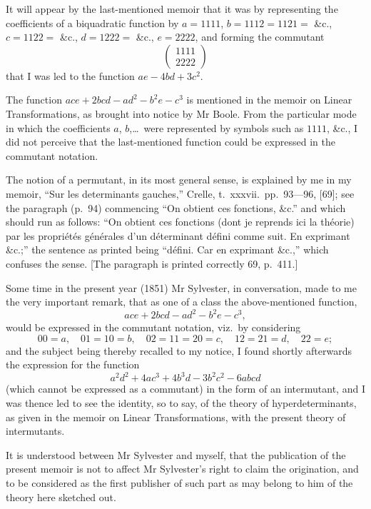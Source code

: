 \documentclass[11pt,a4paper]{article}
\theoremstyle{plain}
\begin{document}
It will appear by the last-mentioned memoir that it was by representing the coefficients of a biquadratic function by $a = 1111$, $b = 1112 = 1121 =$ \&c., $c = 1122 =$ \&c., $d = 1222 =$ \&c., $e = 2222$, and forming the commutant
\[\begin{pmatrix} 1111 \\ 2222 \end{pmatrix}\]
that I was led to the function $ae - 4bd + 3c^2$.

The function $ace + 2bcd - ad^2 - b^2e - c^3$ is mentioned in the memoir on Linear Transformations, as brought into notice by Mr Boole. From the particular mode in which the coefficients $a$, $b$,\ldots\ were represented by symbols such as $1111$, \&c., I did not perceive that the last-mentioned function could be expressed in the commutant notation.

The notion of a permutant, in its most general sense, is explained by me in my memoir, ``Sur les determinants gauches,'' Crelle, t.\ xxxvii.\ pp.\ 93---96, [69]; see the paragraph (p.\ 94) commencing ``On obtient ces fonctions, \&c.'' and which should run as follows: ``On obtient ces fonctions (dont je reprends ici la th\'{e}orie) par les propri\'{e}t\'{e}s g\'{e}n\'{e}rales d'un d\'{e}terminant d\'{e}fini comme suit. En exprimant \&c.;'' the sentence as printed being ``d\'{e}fini. Car en exprimant \&c.,'' which confuses the sense. [The paragraph is printed correctly 69, p.\ 411.]

Some time in the present year (1851) Mr Sylvester, in conversation, made to me the very important remark, that as one of a class the above-mentioned function,
\[ace + 2bcd - ad^2 - b^2e - c^3,\]
would be expressed in the commutant notation, viz.\ by considering
\[00 = a, \quad 01 = 10 = b, \quad 02 = 11 = 20 = c, \quad 12 = 21 = d, \quad 22 = e;\]
and the subject being thereby recalled to my notice, I found shortly afterwards the expression for the function
\[a^2d^2 + 4ac^3 + 4b^3d - 3b^2c^2 - 6abcd\]
(which cannot be expressed as a commutant) in the form of an intermutant, and I was thence led to see the identity, so to say, of the theory of hyperdeterminants, as given in the memoir on Linear Transformations, with the present theory of intermutants.

It is understood between Mr Sylvester and myself, that the publication of the present memoir is not to affect Mr Sylvester's right to claim the origination, and to be considered as the first publisher of such part as may belong to him of the theory here sketched out.
\clearpage
\end{document}

